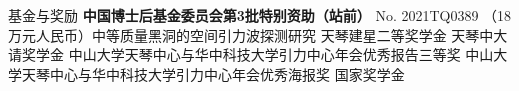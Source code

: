 \begin{rubric}{基金与奖励}
    \entry*[2021-2023] \textbf{中国博士后基金委员会第3批特别资助（站前）} No. 2021TQ0389 （18万元人民币）中等质量黑洞的空间引力波探测研究 
%
    \entry*[2020] 天琴建星二等奖学金
    \entry*[2019] 天琴中大请奖学金
    \entry*[2019] 中山大学天琴中心与华中科技大学引力中心年会优秀报告三等奖 
    \entry*[2018] 中山大学天琴中心与华中科技大学引力中心年会优秀海报奖
    \entry*[2015] 国家奖学金
\end{rubric}
